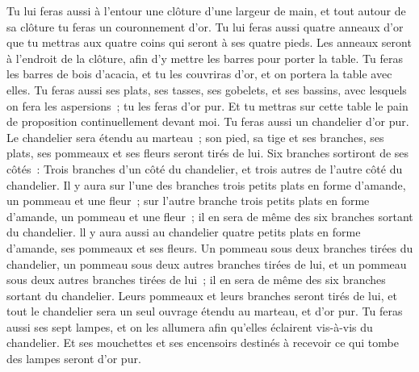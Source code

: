 \begin{multicols}{2}
Tu lui feras aussi à l'entour une clôture d'une largeur de main, et tout autour de sa clôture tu feras un couronnement d'or.
Tu lui feras aussi quatre anneaux d'or que tu mettras aux quatre coins qui seront à ses quatre pieds.
Les anneaux seront à l'endroit de la clôture, afin d'y mettre les barres pour porter la table.
Tu feras les barres de bois d'acacia, et tu les couvriras d'or, et on portera la table avec elles.
Tu feras aussi ses plats, ses tasses, ses gobelets, et ses bassins, avec lesquels on fera les aspersions~; tu les feras d'or pur.
Et tu mettras sur cette table le pain de proposition continuellement devant moi.
Tu feras aussi un chandelier d'or pur. Le chandelier sera étendu au marteau~; son pied, sa tige et ses branches, ses plats, ses pommeaux et ses fleurs seront tirés de lui.
Six branches sortiront de ses côtés~: Trois branches d'un côté du chandelier, et trois autres de l'autre côté du chandelier.
Il y aura sur l'une des branches trois petits plats en forme d'amande, un pommeau et une fleur~; sur l'autre branche trois petits plats en forme d'amande, un pommeau et une fleur~; il en sera de même des six branches sortant du chandelier.
ll y aura aussi au chandelier quatre petits plats en forme d'amande, ses pommeaux et ses fleurs.
Un pommeau sous deux branches tirées du chandelier, un pommeau sous deux autres branches tirées de lui, et un pommeau sous deux autres branches tirées de lui~; il en sera de même des six branches sortant du chandelier.
Leurs pommeaux et leurs branches seront tirés de lui, et tout le chandelier sera un seul ouvrage étendu au marteau, et d'or pur.
Tu feras aussi ses sept lampes, et on les allumera afin qu'elles éclairent vis-à-vis du chandelier.
Et ses mouchettes et ses encensoirs destinés à recevoir ce qui tombe des lampes seront d'or pur.

\end{multicols}
